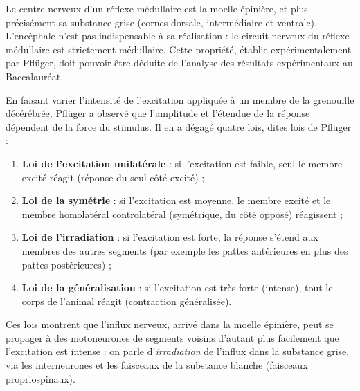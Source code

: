 \documentclass[11pt]{article}
\newcommand{\cle}[1]{{\popxbold\color{popdark}#1}}
\newcounter{popsec}
\newcounter{popsub}
\newcommand{\courssub}[1]{%
  \stepcounter{popsub}%
  \par\vspace{9pt}\noindent{\popxbold\fontsize{11.5}{13}\selectfont\color{popink}{\color{poporange}\thepopsec.\thepopsub}\hspace{6pt}#1}\par\nopagebreak\vspace{4pt}
}
\begin{document}
\begin{propriete}
Le centre nerveux d'un réflexe médullaire est la \cle{moelle épinière}, et plus précisément sa \cle{substance grise} (cornes dorsale, intermédiaire et ventrale). L'encéphale n'est pas indispensable à sa réalisation : le circuit nerveux du réflexe médullaire est strictement médullaire. Cette propriété, établie expérimentalement par Pflüger, doit pouvoir être déduite de l'analyse des résultats expérimentaux au Baccalauréat.
\end{propriete}

\courssub{Les lois de Pflüger}

En faisant varier l'intensité de l'excitation appliquée à un membre de la grenouille décérébrée, Pflüger a observé que l'amplitude et l'étendue de la réponse dépendent de la force du stimulus. Il en a dégagé quatre lois, dites \cle{lois de Pflüger} :

\begin{enumerate}
\item \textbf{Loi de l'excitation unilatérale} : si l'excitation est faible, seul le membre excité réagit (réponse du seul côté excité) ;
\item \textbf{Loi de la symétrie} : si l'excitation est moyenne, le membre excité et le membre homolatéral controlatéral (symétrique, du côté opposé) réagissent ;
\item \textbf{Loi de l'irradiation} : si l'excitation est forte, la réponse s'étend aux membres des autres segments (par exemple les pattes antérieures en plus des pattes postérieures) ;
\item \textbf{Loi de la généralisation} : si l'excitation est très forte (intense), tout le corps de l'animal réagit (contraction généralisée).
\end{enumerate}

Ces lois montrent que l'influx nerveux, arrivé dans la moelle épinière, peut se propager à des motoneurones de segments voisins d'autant plus facilement que l'excitation est intense : on parle d'\emph{irradiation} de l'influx dans la substance grise, via les interneurones et les faisceaux de la substance blanche (faisceaux propriospinaux).
\end{document}
